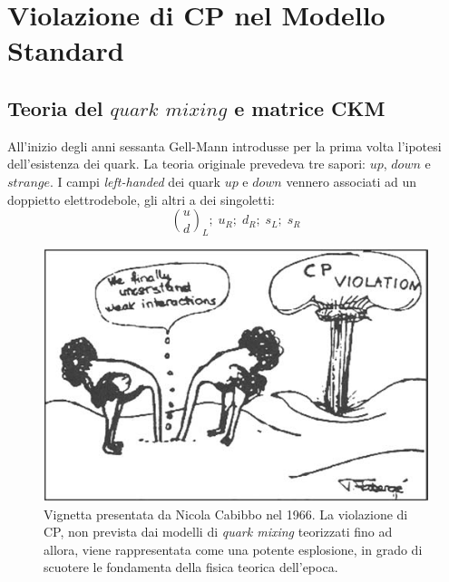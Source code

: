 
\chapter{Violazione di CP nel Modello Standard}
\section{Teoria del $quark$ $mixing$ e matrice CKM}
\noindent
All'inizio degli anni sessanta Gell-Mann introdusse per la prima volta l'ipotesi dell'esistenza dei quark. La teoria originale prevedeva 
tre sapori: $up$, $down$ e $strange$. I campi \emph{left-handed} dei quark $up$ e $down$ vennero associati ad un doppietto elettrodebole, gli altri
a dei singoletti:
\begin{equation}
 \binom{u}{d}_L;\;u_R;\;d_R;\;s_L;\;s_R
\end{equation}
\begin{figure}
\begin{center}
\includegraphics[scale=0.7]{Immagini/vignetta}
\caption{Vignetta presentata da Nicola Cabibbo nel 1966. La violazione di CP, non prevista dai modelli di \emph{quark mixing} teorizzati fino ad allora, viene rappresentata come una potente esplosione, in grado di scuotere le fondamenta della fisica teorica dell'epoca.}
\end{center}
\end{figure}

